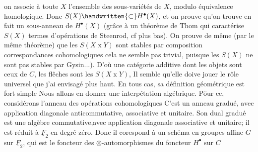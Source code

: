 
 

 on associe à toute $X$  l'ensemble  des sous-variétés  de $X$, modulo équivalence homologique. Donc $S(X)\handwritten{\subset}H^{\bullet}(X)$, et on prouve qu'on trouve en fait un sous-anneau de $H^{\bullet}(X)$ (grâce à un théorème de Thom qui caractérise $S(X)$  termes d'opérations de Steenrod, cf plus bas). On prouve de même (par le même théorème) que les $S(X\mathbin{x}Y)$ sont stables par composition  correspondances cohomologiques\handwritten{(} cela ne semble pas trivial, puisque les $S(X)$ ne sont pas stables par Gysin...). D'où une catégorie additive dont les objets sont ceux de $C$, les flêches sont les  $S(X\mathbin{x}Y)$, Il semble qu'elle doive jouer le rôle universel que j'ai envisagé plus haut. En tous cas, sa définition géométrique est fort simple Nous allons en donner une interpétation algébrique. Pŏur ce, considérons l'anneau des opérations cohomologiques    C'est un anneau gradué, avec application diagonale anticommutative, associative et unitaire. Son dual gradué est une algèbre  commutative,avec application diagonale associative et unitaire; il est réduit à $\underline F_2$ en degré zéro. Donc il corespond à un schéma en groupes affine $G$ sur $\underline F_2$, qui est  le foncteur des $\otimes$-automorphismes  du foncteur $H^{\bullet}$ sur $C$ 

